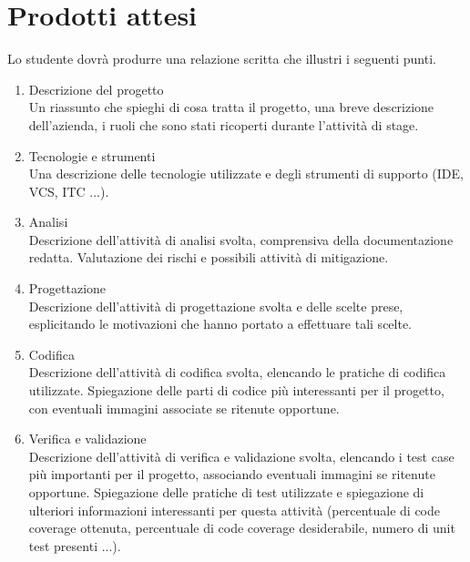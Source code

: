 \section*{Prodotti attesi}
Lo studente dovrà produrre una relazione scritta che illustri i seguenti punti.
\begin{enumerate}
    \item Descrizione del progetto \\
    Un riassunto che spieghi di cosa tratta il progetto, una breve
    descrizione dell'azienda, i ruoli che sono stati ricoperti
    durante l'attività di stage. 
    
    \item Tecnologie e strumenti \\
    Una descrizione delle tecnologie utilizzate e degli strumenti di
    supporto (IDE, VCS, ITC ...).
    
    \item Analisi \\
    Descrizione dell'attività di analisi svolta, comprensiva della
    documentazione redatta. Valutazione dei rischi e possibili
    attività di mitigazione.

    \item Progettazione \\
    Descrizione dell'attività di progettazione svolta e delle 
    scelte prese, esplicitando le motivazioni che hanno portato
    a effettuare tali scelte.

    \item Codifica \\
    Descrizione dell'attività di codifica svolta, elencando le
    pratiche di codifica utilizzate. Spiegazione delle parti di
    codice più interessanti per il progetto, con eventuali immagini
    associate se ritenute opportune.

    \item Verifica e validazione \\
    Descrizione dell'attività di verifica e validazione svolta, 
    elencando i test case più importanti per il progetto, associando
    eventuali immagini se ritenute opportune. Spiegazione delle pratiche
    di test utilizzate e spiegazione di ulteriori informazioni interessanti
    per questa attività (percentuale di code coverage ottenuta, percentuale
    di code coverage desiderabile, numero di unit test presenti ...).


\end{enumerate}

